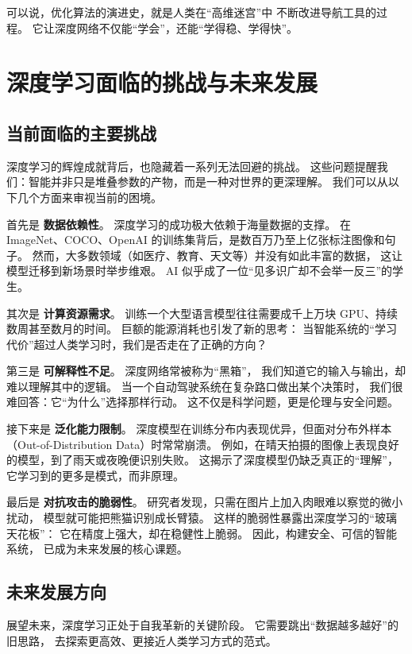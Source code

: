 可以说，优化算法的演进史，就是人类在“高维迷宫”中  
不断改进导航工具的过程。  
它让深度网络不仅能“学会”，还能“学得稳、学得快”。

\section{深度学习面临的挑战与未来发展}

\subsection{当前面临的主要挑战}
深度学习的辉煌成就背后，也隐藏着一系列无法回避的挑战。  
这些问题提醒我们：智能并非只是堆叠参数的产物，而是一种对世界的更深理解。  
我们可以从以下几个方面来审视当前的困境。  

首先是 {\bf 数据依赖性}。  
深度学习的成功极大依赖于海量数据的支撑。  
在 ImageNet、COCO、OpenAI 的训练集背后，是数百万乃至上亿张标注图像和句子。  
然而，大多数领域（如医疗、教育、天文等）并没有如此丰富的数据，  
这让模型迁移到新场景时举步维艰。  
AI 似乎成了一位“见多识广却不会举一反三”的学生。  

其次是 {\bf 计算资源需求}。  
训练一个大型语言模型往往需要成千上万块 GPU、持续数周甚至数月的时间。  
巨额的能源消耗也引发了新的思考：  
当智能系统的“学习代价”超过人类学习时，我们是否走在了正确的方向？  

第三是 {\bf 可解释性不足}。  
深度网络常被称为“黑箱”，  
我们知道它的输入与输出，却难以理解其中的逻辑。  
当一个自动驾驶系统在复杂路口做出某个决策时，  
我们很难回答：它“为什么”选择那样行动。  
这不仅是科学问题，更是伦理与安全问题。  

接下来是 {\bf 泛化能力限制}。  
深度模型在训练分布内表现优异，但面对分布外样本（Out-of-Distribution Data）时常常崩溃。  
例如，在晴天拍摄的图像上表现良好的模型，到了雨天或夜晚便识别失败。  
这揭示了深度模型仍缺乏真正的“理解”，  
它学习到的更多是模式，而非原理。  

最后是 {\bf 对抗攻击的脆弱性}。  
研究者发现，只需在图片上加入肉眼难以察觉的微小扰动，  
模型就可能把熊猫识别成长臂猿。  
这样的脆弱性暴露出深度学习的“玻璃天花板”：  
它在精度上强大，却在稳健性上脆弱。  
因此，构建安全、可信的智能系统，  
已成为未来发展的核心课题。

\subsection{未来发展方向}

展望未来，深度学习正处于自我革新的关键阶段。  
它需要跳出“数据越多越好”的旧思路，  
去探索更高效、更接近人类学习方式的范式。  

